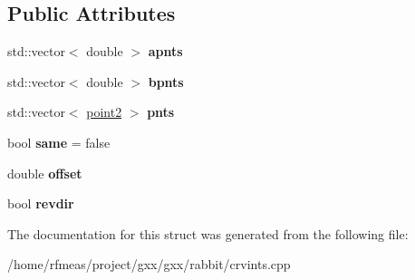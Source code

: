 \subsection*{Public Attributes}
\begin{DoxyCompactItemize}
\item 
std\+::vector$<$ double $>$ {\bfseries apnts}\hypertarget{structrabbit_1_1crvcrv__analytic__intresult_a66b03a0b14c3f4bb821bc03d7042d318}{}\label{structrabbit_1_1crvcrv__analytic__intresult_a66b03a0b14c3f4bb821bc03d7042d318}

\item 
std\+::vector$<$ double $>$ {\bfseries bpnts}\hypertarget{structrabbit_1_1crvcrv__analytic__intresult_a532dcc723b2913a351749e42ceeecad0}{}\label{structrabbit_1_1crvcrv__analytic__intresult_a532dcc723b2913a351749e42ceeecad0}

\item 
std\+::vector$<$ \hyperlink{classmalgo_1_1vector2}{point2} $>$ {\bfseries pnts}\hypertarget{structrabbit_1_1crvcrv__analytic__intresult_a8d93adf1e9c7a29330f89e6744377686}{}\label{structrabbit_1_1crvcrv__analytic__intresult_a8d93adf1e9c7a29330f89e6744377686}

\item 
bool {\bfseries same} = false\hypertarget{structrabbit_1_1crvcrv__analytic__intresult_a7159b0e37296a857f39fbdebe0615106}{}\label{structrabbit_1_1crvcrv__analytic__intresult_a7159b0e37296a857f39fbdebe0615106}

\item 
double {\bfseries offset}\hypertarget{structrabbit_1_1crvcrv__analytic__intresult_ab853796ef10056a14f42b04626dc5da6}{}\label{structrabbit_1_1crvcrv__analytic__intresult_ab853796ef10056a14f42b04626dc5da6}

\item 
bool {\bfseries revdir}\hypertarget{structrabbit_1_1crvcrv__analytic__intresult_ab58dbcadf7dfb53a29730e493255fb8d}{}\label{structrabbit_1_1crvcrv__analytic__intresult_ab58dbcadf7dfb53a29730e493255fb8d}

\end{DoxyCompactItemize}


The documentation for this struct was generated from the following file\+:\begin{DoxyCompactItemize}
\item 
/home/rfmeas/project/gxx/gxx/rabbit/crvints.\+cpp\end{DoxyCompactItemize}
